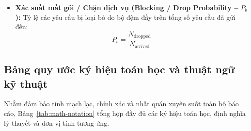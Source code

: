 \begin{itemize}[leftmargin=1.5em]
    \item \textbf{Xác suất mất gói / Chặn dịch vụ (Blocking / Drop Probability -- $P_b$):} Tỷ lệ các yêu cầu bị loại bỏ do bộ đệm đầy trên tổng số yêu cầu đã gửi đến:
    \begin{equation}
        P_b = \frac{N_{\text{dropped}}}{N_{\text{arrived}}}
    \end{equation}
\end{itemize}

\subsection{Bảng quy ước ký hiệu toán học và thuật ngữ kỹ thuật}
\label{subsec:bang-ky-hieu}

\hspace{0.5cm}Nhằm đảm bảo tính mạch lạc, chính xác và nhất quán xuyên suốt toàn bộ báo cáo, Bảng~\ref{tab:math-notation} tổng hợp đầy đủ các ký hiệu toán học, định nghĩa lý thuyết và đơn vị tính tương ứng.
\begingroup
\small
\renewcommand{\arraystretch}{1.35}
\setlength{\tabcolsep}{5pt}
